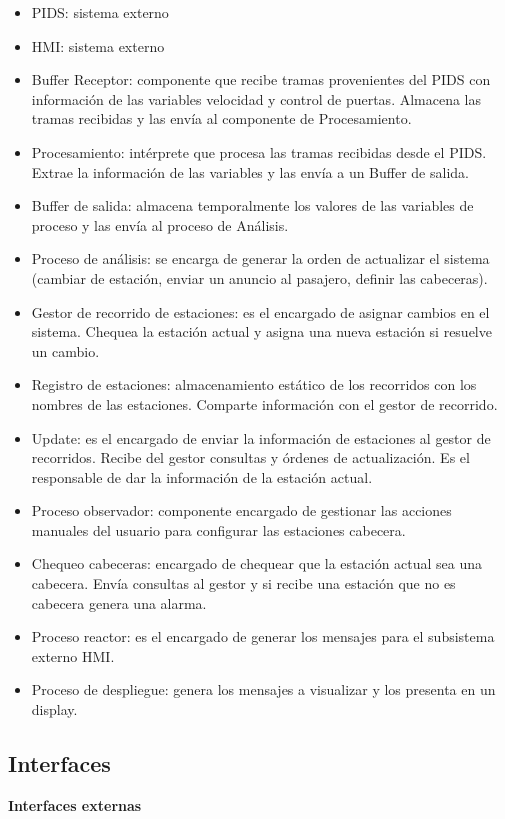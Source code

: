 \documentclass[
11pt, %
]{charter}
\begin{document}
\begin{itemize}
\item PIDS: sistema externo
\item HMI: sistema externo
\item Buffer Receptor: componente que recibe tramas provenientes del PIDS con información
de las variables velocidad y control de puertas. Almacena las tramas recibidas y las
envía al componente de Procesamiento.
\item Procesamiento: intérprete que procesa las tramas recibidas desde el PIDS. Extrae la
información de las variables y las envía a un Buffer de salida.
\item Buffer de salida: almacena temporalmente los valores de las variables de proceso y las
envía al proceso de Análisis.
\item Proceso de análisis: se encarga de generar la orden de actualizar el sistema (cambiar
de estación, enviar un anuncio al pasajero, definir las cabeceras).
\item Gestor de recorrido de estaciones: es el encargado de asignar cambios en el sistema.
Chequea la estación actual y asigna una nueva estación si resuelve un cambio.
\item Registro de estaciones: almacenamiento estático de los recorridos con los nombres de
las estaciones. Comparte información con el gestor de recorrido.
\item Update: es el encargado de enviar la información de estaciones al gestor de recorridos.
Recibe del gestor consultas y órdenes de actualización. Es el responsable de dar la
información de la estación actual.
\item Proceso observador: componente encargado de gestionar las acciones manuales del
usuario para configurar las estaciones cabecera.
\item Chequeo cabeceras: encargado de chequear que la estación actual sea una cabecera.
Envía consultas al gestor y si recibe una estación que no es cabecera genera una
alarma.
\item Proceso reactor: es el encargado de generar los mensajes para el subsistema externo
HMI.
\item Proceso de despliegue: genera los mensajes a visualizar y los presenta en un display.
\end{itemize}

\subsection{Interfaces}
\textbf{Interfaces externas}
\end{document}
